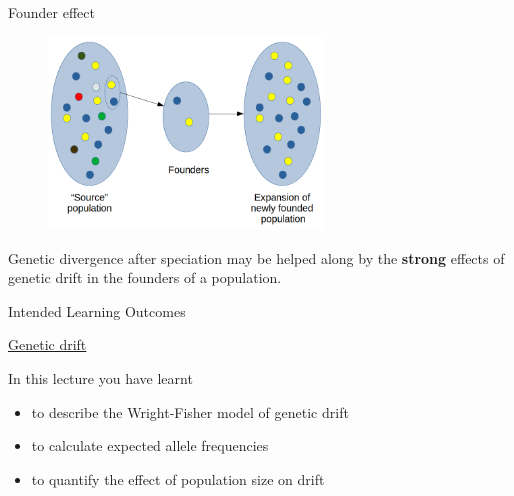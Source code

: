 \begin{frame}{Founder effect}

        \begin{figure}
                \includegraphics[width=0.65\textwidth]{Pics/founder}
        \end{figure}

	Genetic divergence after speciation may be helped along by the \textbf{strong} effects of genetic drift in the
	founders of a population.

\end{frame}


\begin{frame}{Intended Learning Outcomes}

	\underline{Genetic drift}

        \bigskip

        In this lecture you have learnt
        \begin{itemize}
                \item to describe the Wright-Fisher model of genetic drift
                \item to calculate expected allele frequencies
                \item to quantify the effect of population size on drift
        \end{itemize}

\end{frame}




